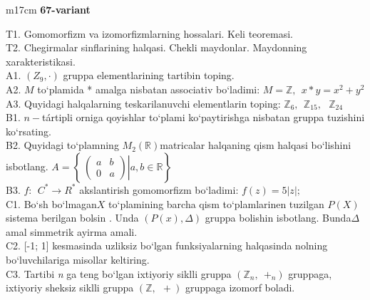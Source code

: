 \documentclass{article}
\begin{document}
\begin{tabular}{m{17cm}}
\textbf{67-variant}
\newline

T1. Gomomorfizm va izomorfizmlarning hossalari. Keli teoremasi. \\
T2. Chegirmalar sinflarining halqasi. Chekli maydonlar. Maydonning xarakteristikasi. \\
A1. \(\left( Z_{9}, \cdot \right)\) gruppa elementlarining tartibin toping. \\
A2. \(M\) to`plamida * amalga nisbatan associativ bo`ladimi: \(M\mathbb{= Z},\ \ x*y = x^{2} + y^{2}\) \\
A3. Quyidagi halqalarning teskarilanuvchi elementlarin toping: \(\mathbb{Z}_{6},\ \ \mathbb{Z}_{15},\ \ \ \mathbb{Z}_{24}\) \\
B1. \(n -\)tártipli orniga qoyishlar to`plami ko`paytirishga nisbatan gruppa tuzishini ko`rsating. \\
B2. Quyidagi to`plamning \(M_{2}(\mathbb{R})\)matricalar halqaning qism halqasi bo`lishini isbotlang. \(A = \left\{ \left. \ \begin{pmatrix}
a & b \\
0 & a
\end{pmatrix} \right|a,b\mathbb{\in R} \right\}\) \\
B3. \(f:\ \ C^{*} \rightarrow R^{*}\) akslantirish gomomorfizm bo`ladimi: \(f(z) = 5|z|;\) \\
C1. Bo`sh bo`lmagan\(X\) to`plamining barcha qism to`plamlarinen tuzilgan \(P(X)\) sistema berilgan bo\textquotesingle lsin . Unda \((P(x),\Delta)\) gruppa bolishin isbotlang. Bunda\(\Delta\) amal simmetrik ayirma amali. \\
C2. {[}-1; 1{]} kesmasinda uzliksiz bo`lgan funksiyalarning halqasinda nolning bo`luvchilariga misollar keltiring. \\
C3. Tartibi \emph{n} ga teng bo`lgan ixtiyoriy siklli gruppa \((\mathbb{Z}_{n},\ \  +_{n})\) gruppaga, ixtiyoriy sheksiz siklli gruppa \((\mathbb{Z},\ \  + )\) gruppaga izomorf boladi. \\

\end{tabular}
\vspace{1cm}
\end{document}
